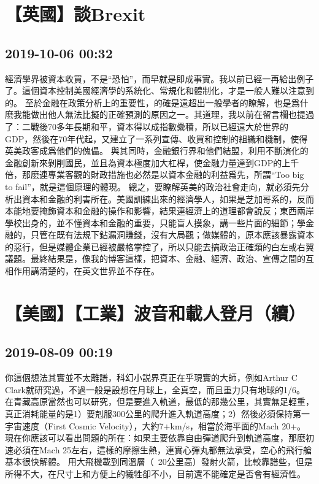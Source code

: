 \documentclass[twocolumn]{ctexart}
\begin{document}
\section*{【英國】談Brexit}
\subsection*{2019-10-06 00:32}

經濟學界被資本收買，不是“恐怕”，而早就是即成事實。我以前已經一再給出例子了。這個資本控制美國經濟學的系統化、常規化和體制化，才是一般人難以注意到的。 
至於金融在政策分析上的重要性，的確是遠超出一般學者的瞭解，也是爲什麽我能做出他人無法比擬的正確預測的原因之一。其道理，我以前在留言欄也提過了：二戰後70多年長期和平，資本得以成指數纍積，所以已經遠大於世界的GDP，然後在70年代起，又建立了一系列宣傳、收買和控制的組織和機制，使得英美政客成爲他們的傀儡。 
與其同時，金融銀行界和他們結盟，利用不斷演化的金融創新來剝削國民，並且為資本極度加大杠桿，使金融力量達到GDP的上千倍，那麽連專業客觀的財政措施也必然是以資本金融的利益爲先，所謂“Too big to fail”，就是這個原理的體現。 
總之，要瞭解英美的政治社會走向，就必須先分析出資本和金融的利害所在。美國訓練出來的經濟學人，如果是芝加哥系的，反而本能地要掩飾資本和金融的操作和影響，結果連經濟上的道理都會說反；東西兩岸學校出身的，並不懂資本和金融的重要，只能盲人摸象，講一些片面的細節；學金融的，只管在既有法規下鉆漏洞賺錢，沒有大局觀；做媒體的，原本應該暴露資本的惡行，但是媒體企業已經被嚴格掌控了，所以只能去搞政治正確類的白左或右翼議題。最終結果是，像我的博客這樣，把資本、金融、經濟、政治、宣傳之間的互相作用講清楚的，在英文世界並不存在。
\section*{【美國】【工業】波音和載人登月（續）}
\subsection*{2019-08-09 00:19}

你這個想法其實並不太離譜，科幻小説界真正在乎現實的大師，例如Arthur C Clark就研究過，不過一般是設想在月球上，全真空，而且重力只有地球的1/6。 
在青藏高原當然也可以研究，但是要進入軌道，最低的那幾公里，其實無足輕重，真正消耗能量的是1）要剋服300公里的爬升進入軌道高度；2）然後必須保持第一宇宙速度（First Cosmic Velocity），大約7+km/s，相當於海平面的Mach 20+。 
現在你應該可以看出問題的所在：如果主要依靠自由彈道爬升到軌道高度，那麽初速必須在Mach 25左右，這樣的摩擦生熱，連實心彈丸都無法承受，空心的飛行艙基本很快解體。 
用大飛機載到同溫層（~20公里高）發射火箭，比較靠譜些，但是所得不大，在尺寸上和方便上的犧牲卻不小，目前還不能確定是否會有經濟性。
\end{document}
